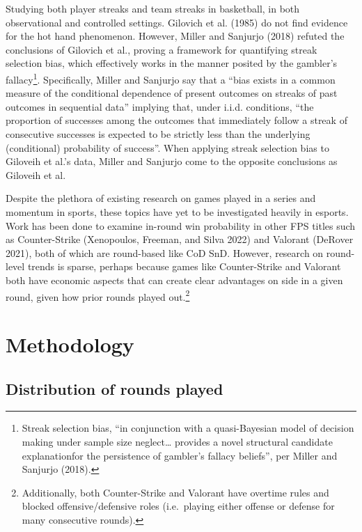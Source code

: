 \documentclass{article}
\begin{document}
Studying both player streaks and team streaks in basketball, in both
observational and controlled settings. Gilovich et al. (1985) do not
find evidence for the hot hand phenomenon. However, Miller and Sanjurjo
(2018) refuted the conclusions of Gilovich et al., proving a framework
for quantifying streak selection bias, which effectively works in the
manner posited by the gambler's fallacy\footnote{Streak selection bias,
  ``in conjunction with a quasi-Bayesian model of decision making under
  sample size neglect\ldots{} provides a novel structural candidate
  explanationfor the persistence of gambler's fallacy beliefs'', per
  Miller and Sanjurjo (2018).}. Specifically, Miller and Sanjurjo say
that a ``bias exists in a common measure of the conditional dependence
of present outcomes on streaks of past outcomes in sequential data''
implying that, under i.i.d. conditions, ``the proportion of successes
among the outcomes that immediately follow a streak of consecutive
successes is expected to be strictly less than the underlying
(conditional) probability of success''. When applying streak selection
bias to Giloveih et al.'s data, Miller and Sanjurjo come to the opposite
conclusions as Giloveih et al.

Despite the plethora of existing research on games played in a series
and momentum in sports, these topics have yet to be investigated heavily
in esports. Work has been done to examine in-round win probability in
other FPS titles such as Counter-Strike (Xenopoulos, Freeman, and Silva
2022) and Valorant (DeRover 2021), both of which are round-based like
CoD SnD. However, research on round-level trends is sparse, perhaps
because games like Counter-Strike and Valorant both have economic
aspects that can create clear advantages on side in a given round, given
how prior rounds played out.\footnote{Additionally, both Counter-Strike
  and Valorant have overtime rules and blocked offensive/defensive roles
  (i.e.~playing either offense or defense for many consecutive rounds).}

\hypertarget{methodology}{%
\section{Methodology}\label{methodology}}

\hypertarget{sec:method-rounds-played}{%
\subsection{Distribution of rounds
played}\label{sec:method-rounds-played}}
\end{document}

